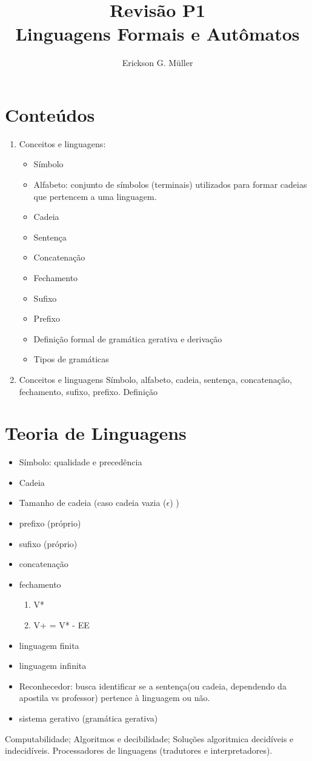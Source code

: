 \documentclass[]{article}
\title{Revisão P1\\Linguagens Formais e Autômatos}
\author{Erickson G. Müller}
\date{}
\begin{document}
	\maketitle
	\section*	{Conteúdos}
		\begin{enumerate}
			\item Conceitos e linguagens: 
			\begin{itemize}
				\item Símbolo
				\item Alfabeto: conjunto de símbolos (terminais) utilizados para formar cadeias que pertencem a uma linguagem.
				\item Cadeia
				\item Sentença 
				\item Concatenação
				\item Fechamento 
				\item Sufixo
				\item Prefixo
				\item Definição formal de gramática gerativa e derivação
				\item Tipos de gramáticas
			\end{itemize}
			\item Conceitos e linguagens
				Símbolo, alfabeto, cadeia, sentença, concatenação, fechamento, sufixo, prefixo. Definição
		\end{enumerate}
	\section{Teoria de Linguagens}
		\begin{itemize}
			\item Símbolo: qualidade e precedência
			\item Cadeia
			\item Tamanho de cadeia (caso cadeia vazia ($\epsilon$) )%
			\item prefixo (próprio)
			\item sufixo (próprio)
			\item concatenação
			\item fechamento
			\begin{enumerate}
				\item V*
				\item V+ = V* - {EE}
			\end{enumerate}
			\item linguagem finita
			\item linguagem infinita
			\item Reconhecedor: busca identificar se a sentença(ou cadeia, dependendo da apostila vs professor) pertence à linguagem ou não.
			\item sistema gerativo (gramática gerativa)

		\end{itemize}
		Computabilidade; Algoritmos e decibilidade; Soluções algoritmica decidíveis e indecidíveis. Processadores de linguagens (tradutores e interpretadores).
		
\end{document}

